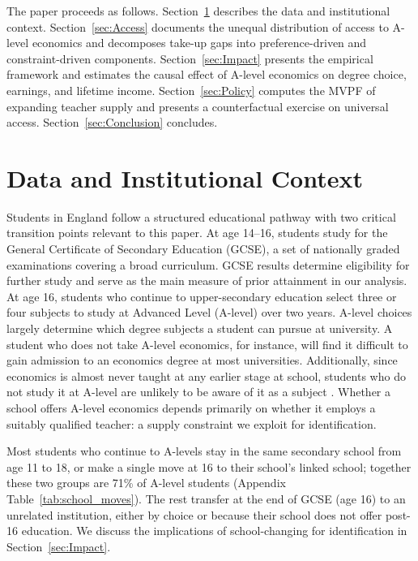 
The paper proceeds as follows. Section~\ref{sec:Data} describes the data and institutional context. Section~\ref{sec:Access} documents the unequal distribution of access to A-level economics and decomposes take-up gaps into preference-driven and constraint-driven components. Section~\ref{sec:Impact} presents the empirical framework and estimates the causal effect of A-level economics on degree choice, earnings, and lifetime income. Section~\ref{sec:Policy} computes the MVPF of expanding teacher supply and presents a counterfactual exercise on universal access. Section~\ref{sec:Conclusion} concludes.


\section{Data and Institutional Context}
\label{sec:Data}

Students in England follow a structured educational pathway with two critical transition points relevant to this paper. At age 14--16, students study for the General Certificate of Secondary Education (GCSE), a set of nationally graded examinations covering a broad curriculum. GCSE results determine eligibility for further study and serve as the main measure of prior attainment in our analysis. At age 16, students who continue to upper-secondary education select three or four subjects to study at Advanced Level (A-level) over two years. A-level choices largely determine which degree subjects a student can pursue at university. A student who does not take A-level economics, for instance, will find it difficult to gain admission to an economics degree at most universities. Additionally, since economics is almost never taught at any earlier stage at school, students who do not study it at A-level are unlikely to be aware of it as a subject \citep{smith2025discoverecon}. Whether a school offers A-level economics depends primarily on whether it employs a suitably qualified teacher: a supply constraint we exploit for identification.

Most students who continue to A-levels stay in the same secondary school from age 11 to 18, or make a single move at 16 to their school's linked school; together these two groups are 71\% of A-level students (Appendix Table~\ref{tab:school_moves}). The rest transfer at the end of GCSE (age 16) to an unrelated institution, either by choice or because their school does not offer post-16 education. We discuss the implications of school-changing for identification in Section~\ref{sec:Impact}.

